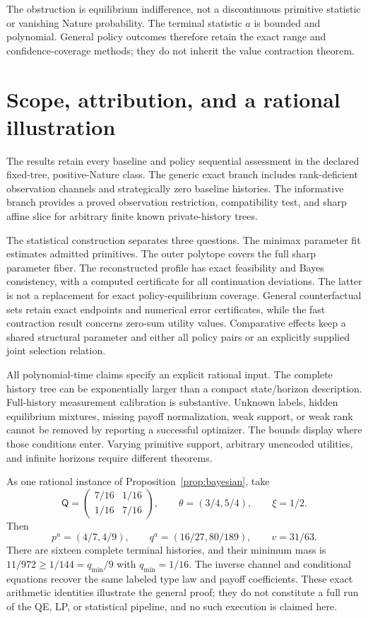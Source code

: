 \documentclass[11pt,a4paper]{article}
\numberwithin{equation}{section}
\theoremstyle{definition}
\begin{document}
The obstruction is equilibrium indifference, not a discontinuous
primitive statistic or vanishing Nature probability. The terminal
statistic \(a\) is bounded and polynomial. General policy outcomes
therefore retain the exact range and confidence-coverage methods;
they do not inherit the value contraction theorem.

\section{Scope, attribution, and a rational illustration}
\label{sec:conclusion}
The results retain every baseline and policy sequential assessment
in the declared fixed-tree, positive-Nature class.
The generic exact branch includes rank-deficient observation channels
and strategically zero baseline histories.
The informative branch provides a proved observation restriction,
compatibility test, and sharp affine slice for arbitrary finite known
private-history trees.

The statistical construction separates three questions.
The minimax parameter fit estimates admitted primitives.
The outer polytope covers the full sharp parameter fiber.
The reconstructed profile has exact feasibility and Bayes consistency,
with a computed certificate for all continuation deviations.
The latter is not a replacement for exact policy-equilibrium coverage.
General counterfactual sets retain exact endpoints and numerical
error certificates, while the fast contraction result concerns
zero-sum utility values. Comparative effects keep a shared structural
parameter and either all policy pairs or an explicitly supplied
joint selection relation.

All polynomial-time claims specify an explicit rational input.
The complete history tree can be exponentially larger than a compact
state/horizon description. Full-history measurement calibration is
substantive. Unknown labels, hidden equilibrium mixtures, missing
payoff normalization, weak support, or weak rank cannot be removed by
reporting a successful optimizer. The bounds display where those
conditions enter. Varying primitive support, arbitrary unencoded
utilities, and infinite horizons require different theorems.

As one rational instance of Proposition~\ref{prop:bayesian}, take
\[
 \mathsf Q=
   \begin{pmatrix}7/16&1/16\\1/16&7/16\end{pmatrix},\qquad
 \theta=(3/4,5/4),\qquad \xi=1/2.
\]
Then
\[
 p^a=(4/7,4/9),\qquad q^a=(16/27,80/189),\qquad
 v=31/63 .
\]
There are sixteen complete terminal histories, and their minimum
mass is \(11/972\ge1/144=q_{\min}/9\) with \(q_{\min}=1/16\).
The inverse channel and conditional equations recover the same
labeled type law and payoff coefficients.
These exact arithmetic identities illustrate the general proof;
they do not constitute a full run of the QE, LP, or statistical
pipeline, and no such execution is claimed here.
\end{document}
